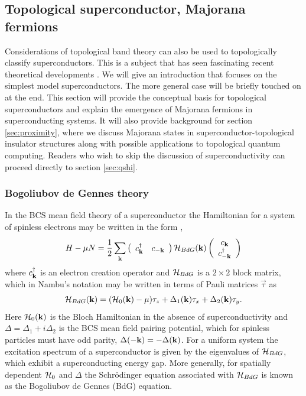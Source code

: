 \documentclass[twocolumn,floatfix,showpacs,rmp,aps]{revtex4}
\begin{document}
	
	\subsection{Topological superconductor, Majorana fermions}
	\label{sec:superconductor}
	
	Considerations of topological band theory can also be used to
	topologically classify superconductors.  This is a subject that has seen
	fascinating recent theoretical
	developments \cite{schnyder08,kitaev09,qihughesraduzhang09,roy08}.
	We will give an introduction that focuses on the simplest
	model superconductors.  The more
	general case will be briefly touched on at the end.  This section will provide
	the conceptual basis for topological superconductors and explain
	the emergence of Majorana fermions in superconducting
	systems.  It will also provide background for section \ref{sec:proximity}, where we
	discuss Majorana states in superconductor-topological
	insulator structures along with possible applications to topological
	quantum computing.  Readers who wish to skip the discussion of superconductivity
	can proceed directly to section \ref{sec:qshi}.
	
	\subsubsection{Bogoliubov de Gennes theory}
	\label{sec:bdg}
	
	In the BCS mean field theory of a superconductor the Hamiltonian for a system
	of spinless electrons may be written in the form \cite{degennes66},
	\begin{equation}
		H-\mu N =
		\frac{1}{2}\sum_{\bf k} \left(\begin{array}{cc} c_{\bf k}^\dagger & c_{-{\bf k}} \end{array}\right)
		{\cal H}_{BdG}({\bf k})
		\left(\begin{array}{c} c_{\bf k} \\ c_{-{\bf k}}^\dagger \end{array}\right)
		\label{bdg}
	\end{equation}
	where $c_{\bf k}^\dagger$ is an electron creation operator and
	${\cal H}_{BdG}$ is a $2 \times 2$ block matrix, which in Nambu's notation
	may be written in terms of Pauli matrices $\vec\tau$ as
	\begin{equation}
		{\cal H}_{BdG}({\bf k}) = ({\cal H}_0({\bf k})-\mu) \tau_z + \Delta_1({\bf k})
		\tau_x + \Delta_2({\bf k}) \tau_y.
	\end{equation}
	Here ${\cal H}_0({\bf k})$ is the Bloch Hamiltonian in the absence of
	superconductivity and $\Delta = \Delta_1 + i\Delta_2$ is the BCS mean
	field pairing potential, which for spinless particles must have odd parity,
	$\Delta(-{\bf k}) = -\Delta({\bf k})$.
	For a uniform system the excitation spectrum
	of a superconductor is given by the eigenvalues of ${\cal
		H}_{BdG}$, which exhibit a superconducting energy gap.  More generally, for
	spatially dependent ${\cal H}_0$ and
	$\Delta$ the Schr\"odinger equation associated with ${\cal H}_{BdG}$ is
	known as the Bogoliubov de Gennes (BdG) equation.
	
\end{document}
